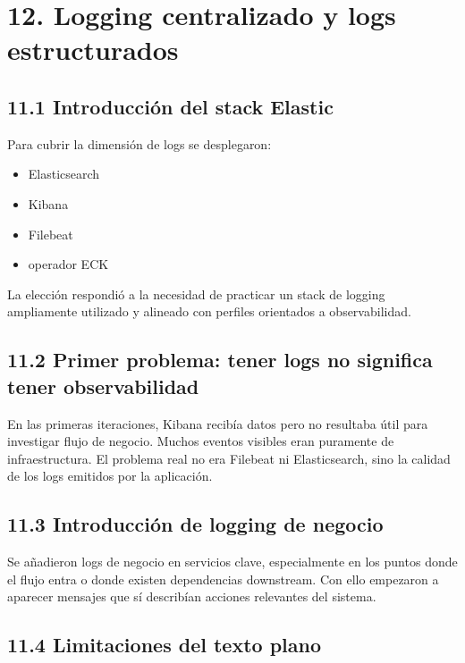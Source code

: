 \documentclass[
a4paper,
12pt]{report}
\providecommand{\tightlist}{%
  \setlength{\itemsep}{0pt}\setlength{\parskip}{0pt}}
\begin{document}
\chapter{12. Logging centralizado y logs
estructurados}\label{logging-centralizado-y-logs-estructurados}

\section{11.1 Introducción del stack
Elastic}\label{introducciuxf3n-del-stack-elastic}

Para cubrir la dimensión de logs se desplegaron:

\begin{itemize}
\tightlist
\item
  Elasticsearch
\item
  Kibana
\item
  Filebeat
\item
  operador ECK
\end{itemize}

La elección respondió a la necesidad de practicar un stack de logging
ampliamente utilizado y alineado con perfiles orientados a
observabilidad.

\section{11.2 Primer problema: tener logs no significa tener
observabilidad}\label{primer-problema-tener-logs-no-significa-tener-observabilidad}

En las primeras iteraciones, Kibana recibía datos pero no resultaba útil
para investigar flujo de negocio. Muchos eventos visibles eran puramente
de infraestructura. El problema real no era Filebeat ni Elasticsearch,
sino la calidad de los logs emitidos por la aplicación.

\section{11.3 Introducción de logging de
negocio}\label{introducciuxf3n-de-logging-de-negocio}

Se añadieron logs de negocio en servicios clave, especialmente en los
puntos donde el flujo entra o donde existen dependencias downstream. Con
ello empezaron a aparecer mensajes que sí describían acciones relevantes
del sistema.

\section{11.4 Limitaciones del texto
plano}\label{limitaciones-del-texto-plano}
\end{document}
